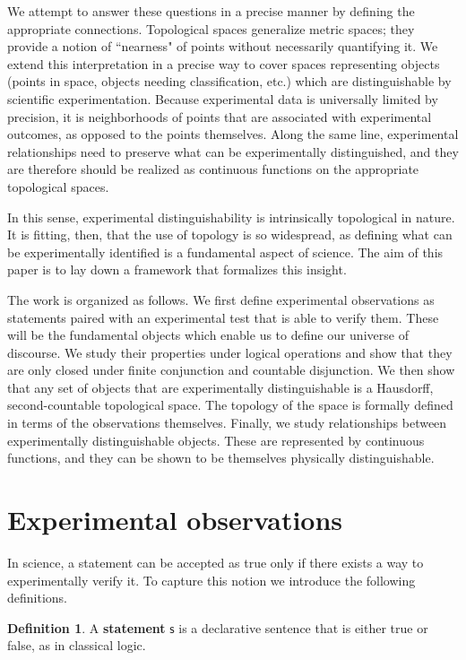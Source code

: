 \documentclass[review]{elsarticle}
\theoremstyle{plain}%
\theoremstyle{definition}
\newtheorem{defn}{Definition}[section]
\theoremstyle{remark}
\begin{document}
We attempt to answer these questions in a precise manner by defining the appropriate connections. Topological spaces generalize metric spaces; they provide a notion of ``nearness" of points without necessarily quantifying it. We extend this interpretation in a precise way to cover spaces representing objects (points in space, objects needing classification, etc.) which are distinguishable by scientific experimentation. Because experimental data is universally limited by precision, it is neighborhoods of points that are associated with experimental outcomes, as opposed to the points themselves. Along the same line, experimental relationships need to preserve what can be experimentally distinguished, and they are therefore should be realized as continuous functions on the appropriate topological spaces.

In this sense, experimental distinguishability is intrinsically topological in nature. It is fitting, then, that the use of topology is so widespread, as defining what can be experimentally identified is a fundamental aspect of science. The aim of this paper is to lay down a framework that formalizes this insight. 

The work is organized as follows. We first define experimental observations as statements paired with an experimental test that is able to verify them. These will be the fundamental objects which enable us to define our universe of discourse. We study their properties under logical operations and show that they are only closed under finite conjunction and countable disjunction.  We then show that any set of objects that are experimentally distinguishable is a Hausdorff, second-countable topological space. The topology of the space is formally defined in terms of the observations themselves.  Finally, we study relationships between experimentally distinguishable objects. These are represented by continuous functions, and they can be shown to be themselves physically distinguishable.


\section{Experimental observations}

In science, a statement can be accepted as true only if there exists a way to experimentally verify it. To capture this notion we introduce the following definitions.

\begin{defn}
	A \textbf{statement} $\mathsf{s}$ is a declarative sentence that is either true or false, as in classical logic. 
\end{defn}
\end{document}
